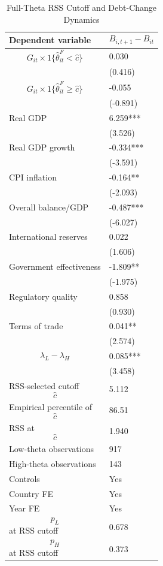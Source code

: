 \begin{table}[H]\centering
\begin{threeparttable}
\caption{Full-Theta RSS Cutoff and Debt-Change Dynamics}
\label{tab:deltaB_rss_cutoff_fulltheta}
\scriptsize
\begin{tabularx}{\textwidth}{lY}
\toprule
Dependent variable & $$B_{i,t+1}-B_{it}$$ \\
\midrule
$$G_{it}\times 1\{\widehat{\theta}^{F}_{it}<\widehat{c}\}$$ & 0.030 \\
 & (0.416) \\
$$G_{it}\times 1\{\widehat{\theta}^{F}_{it}\geq\widehat{c}\}$$ & -0.055 \\
 & (-0.891) \\
Real GDP & 6.259*** \\
 & (3.526) \\
Real GDP growth & -0.334*** \\
 & (-3.591) \\
CPI inflation & -0.164** \\
 & (-2.093) \\
Overall balance/GDP & -0.487*** \\
 & (-6.027) \\
International reserves & 0.022 \\
 & (1.606) \\
Government effectiveness & -1.809** \\
 & (-1.975) \\
Regulatory quality & 0.858 \\
 & (0.930) \\
Terms of trade & 0.041** \\
 & (2.574) \\
$$\lambda_L-\lambda_H$$ & 0.085*** \\
 & (3.458) \\
\midrule
RSS-selected cutoff $$\widehat{c}$$ & 5.112 \\
Empirical percentile of $$\widehat{c}$$ & 86.51 \\
RSS at $$\widehat{c}$$ & 1.940 \\
Low-theta observations & 917 \\
High-theta observations & 143 \\
Controls & Yes \\
Country FE & Yes \\
Year FE & Yes \\
$$p_L$$ at RSS cutoff & 0.678 \\
$$p_H$$ at RSS cutoff & 0.373 \\

\end{tabularx}
\end{threeparttable}
\end{table}
